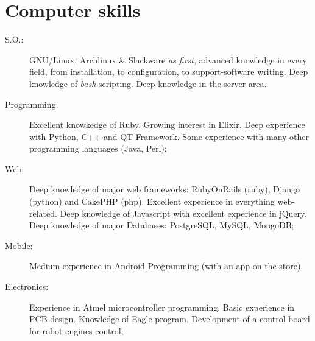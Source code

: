 \documentclass[pdftex, a4paper, 11pt]{article}
\begin{document}
\section*{Computer skills}
\begin{description}
\item[S.O.:] GNU/Linux, Archlinux \& Slackware {\em as first}, advanced knowledge
  in every field, from installation, to configuration, to support-software
  writing. Deep knowledge of {\em bash} scripting.
  Deep knowledge in the server area.
\item[Programming:] Excellent knowkedge of Ruby. Growing interest in Elixir. Deep experience with Python, C++ and QT Framework.
  Some experience with many other programming languages (Java, Perl);
\item[Web:] Deep knowledge of major web frameworks: RubyOnRails (ruby),
  Django (python) and CakePHP (php).
  Excellent experience in everything web-related.
  Deep knowledge of Javascript with excellent experience in jQuery.
  Deep knowledge of major Databases: PostgreSQL, MySQL, MongoDB;
\item[Mobile:] Medium experience in Android Programming (with an app on the store).
\item[Electronics:] Experience in Atmel microcontroller programming. Basic experience
  in PCB design. Knowledge of Eagle program. Development of a control board for robot
  engines control;
\end{description}
\end{document}
